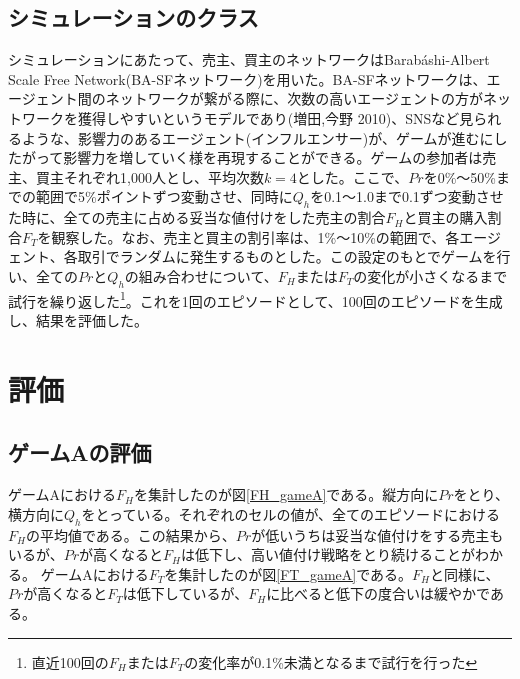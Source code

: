 \documentclass[a4paper,fontsize=11pt,report,notitlepage,line_length=38zw,number_of_lines=40,dvipdfmx]{jlreq}
\begin{document}
\section{シミュレーションのクラス}
シミュレーションにあたって、売主、買主のネットワークはBarab\'{a}shi-Albert Scale Free Network(BA-SFネットワーク)を用いた。BA-SFネットワークは、エージェント間のネットワークが繋がる際に、次数の高いエージェントの方がネットワークを獲得しやすいというモデルであり(増田,今野 2010)\cite{masuda2010}、SNSなど見られるような、影響力のあるエージェント(インフルエンサー)が、ゲームが進むにしたがって影響力を増していく様を再現することができる。ゲームの参加者は売主、買主それぞれ1,000人とし、平均次数$k=4$とした。ここで、$Pr$を0\%〜50\%までの範囲で5\%ポイントずつ変動させ、同時に$Q_h$を0.1〜1.0まで0.1ずつ変動させた時に、全ての売主に占める妥当な値付けをした売主の割合$F_H$と買主の購入割合$F_T$を観察した。なお、売主と買主の割引率は、1\%〜10\%の範囲で、各エージェント、各取引でランダムに発生するものとした。この設定のもとでゲームを行い、全ての$Pr$と$Q_h$の組み合わせについて、$F_H$または$F_T$の変化が小さくなるまで試行を繰り返した\footnote{直近100回の$F_H$または$F_T$の変化率が0.1\%未満となるまで試行を行った}。これを1回のエピソードとして、100回のエピソードを生成し、結果を評価した。

\chapter{評価}
\section{ゲームAの評価}
ゲームAにおける$F_H$を集計したのが図\ref{FH_gameA}である。縦方向に$Pr$をとり、横方向に$Q_h$をとっている。それぞれのセルの値が、全てのエピソードにおける$F_H$の平均値である。この結果から、$Pr$が低いうちは妥当な値付けをする売主もいるが、$Pr$が高くなると$F_H$は低下し、高い値付け戦略をとり続けることがわかる。
ゲームAにおける$F_T$を集計したのが図\ref{FT_gameA}である。$F_H$と同様に、$Pr$が高くなると$F_T$は低下しているが、$F_H$に比べると低下の度合いは緩やかである。

\end{document}
